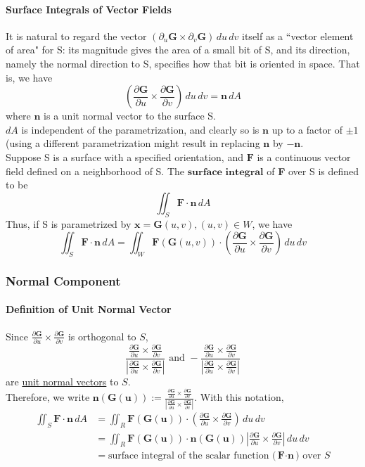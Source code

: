 \documentclass[11pt]{article}
\newcommand{\tb}[1]{\textbf{#1}}
\newcommand{\under}[1]{\underline{#1}}
\newcommand{\vx}[0]{\tb{x}}
\newcommand{\vf}[0]{\tb{F}}
\newcommand{\vg}[0]{\tb{G}}
\newcommand{\vn}[0]{\tb{n}}
\newcommand{\vu}[0]{\tb{u}}
\newcommand{\p}[0]{\partial}
\begin{document}
\paragraph{Surface Integrals of Vector Fields} It is natural to regard the vector $(\partial_u \tb{G} \times \partial_v \tb{G}) \, du \, dv$ itself as a ``vector element of area" for S: its magnitude gives the area of a small bit of S, and its direction, namely the normal direction to S, specifies how that bit is oriented in space. That is, we have
$$(\frac{\partial \tb{G}}{\partial u} \times \frac{\partial \tb{G}}{\partial v}) \, du \, dv = \tb{n}\, dA$$ where $\tb{n}$ is a unit normal vector to the surface S. \\
$dA$ is independent of the parametrization, and clearly so is $\tb{n}$ up to a factor of $\pm 1$ (using a different parametrization might result in replacing $\tb{n}$ by $-\tb{n}$. \\
Suppose S is a surface with a specified orientation, and $\tb{F}$ is a continuous vector field defined on a neighborhood of S. The $\tb{surface integral}$ of \tb{F} over S is defined to be $$\iint_S \tb{F}\cdot \tb{n}\, dA$$
Thus, if S is parametrized by $\vx = \tb{G}(u,v), (u,v)\in W$, we have
$$\iint_S \tb{F}\cdot \tb{n}\, dA = \iint_W \tb{F}(\tb{G}(u,v))\cdot (\frac{\partial \tb{G}}{\partial u} \times \frac{\partial \tb{G}}{\partial v}) \, du \, dv$$
\subsubsection{Normal Component}
\paragraph{Definition of Unit Normal Vector}
Since $\frac{\p \vg}{\p u} \times \frac{\p \vg}{\p v}$ is orthogonal to $S$,
$$\frac{\frac{\p \vg}{\p u} \times \frac{\p \vg}{\p v}}{|\frac{\p \vg}{\p u} \times \frac{\p \vg}{\p v}|} \mbox{ and } -\frac{\frac{\p \vg}{\p u} \times \frac{\p \vg}{\p v}}{|\frac{\p \vg}{\p u} \times \frac{\p \vg}{\p v}|}$$
are \under{unit normal vectors} to $S$. \\
Therefore, we write $\vn(\vg(\vu)) := \frac{\frac{\p \vg}{\p u} \times \frac{\p \vg}{\p v}}{|\frac{\p \vg}{\p u} \times \frac{\p \vg}{\p v}|}$.
With this notation,
\begin{align*}
	\iint_S \vf \cdot \vn \, dA &= \iint_R \vf(\vg(\vu))\cdot (\frac{\p \vg}{\p u} \times \frac{\p \vg}{\p v}) \,du\,dv \\
	&= \iint_R \vf(\vg(\vu))\cdot \vn(\vg(\vu))|\frac{\p \vg}{\p u} \times \frac{\p \vg}{\p v}| \,du\,dv\\
	&= \mbox{surface integral of the scalar function ($\vf \cdot \vn$) over $S$}
\end{align*}
\end{document}
